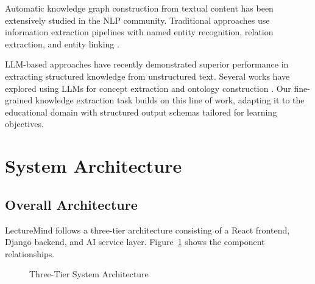 \documentclass[12pt,a4paper]{article}
\begin{document}
Automatic knowledge graph construction from textual content has been extensively studied in the NLP community. Traditional approaches use information extraction pipelines with named entity recognition, relation extraction, and entity linking \cite{hoffmann2011knowledge}. 

LLM-based approaches have recently demonstrated superior performance in extracting structured knowledge from unstructured text. Several works have explored using LLMs for concept extraction \cite{gutierrez2023llm} and ontology construction \cite{pan2023ontology}. Our fine-grained knowledge extraction task builds on this line of work, adapting it to the educational domain with structured output schemas tailored for learning objectives.

\section{System Architecture}
\label{sec:architecture}

\subsection{Overall Architecture}

LectureMind follows a three-tier architecture consisting of a React frontend, Django backend, and AI service layer. Figure~\ref{fig:architecture} shows the component relationships.

\begin{figure}[H]
    \centering
    \caption{Three-Tier System Architecture}
    \label{fig:architecture}
\end{figure}
\end{document}
